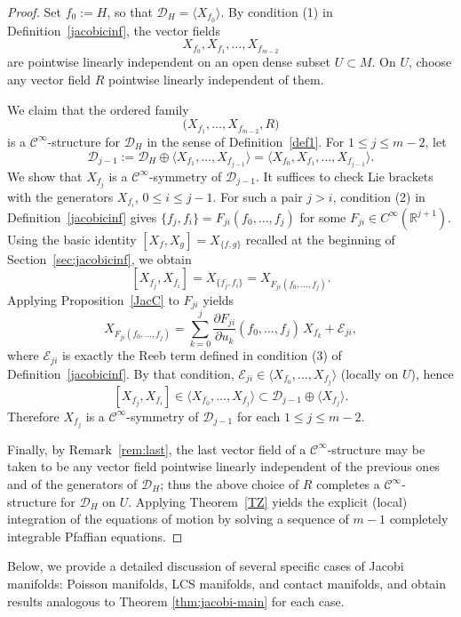 \documentclass{article}
\theoremstyle{remark}
\theoremstyle{definition}
\newcommand{\cinf}{$\mathcal{C}^{\infty}$}
\begin{document}
\begin{proof}
Set $f_0:=H$, so that $\mathcal{D}_H=\langle X_{f_0}\rangle$.
By condition \textup{(1)} in Definition~\ref{jacobicinf}, the vector fields
\[
X_{f_0},X_{f_1},\dots,X_{f_{m-2}}
\]
are pointwise linearly independent on an open dense subset $U\subset M$.
On $U$, choose any vector field $R$ pointwise linearly independent of them.

We claim that the ordered family
\[
\bigl(X_{f_1},\dots,X_{f_{m-2}},R\bigr)
\]
is a \cinf-structure for $\mathcal{D}_H$ in the sense of Definition~\ref{def1}.
For $1\le j\le m-2$, let
\[
\mathcal{D}_{j-1}:=\mathcal{D}_H\oplus\langle X_{f_1},\dots,X_{f_{j-1}}\rangle
=\langle X_{f_0},X_{f_1},\dots,X_{f_{j-1}}\rangle.
\]
We show that $X_{f_j}$ is a \cinf-symmetry of $\mathcal{D}_{j-1}$.
It suffices to check Lie brackets with the generators $X_{f_i}$, $0\le i\le j-1$.
For such a pair $j>i$, condition \textup{(2)} in Definition~\ref{jacobicinf} gives
\(
\{f_j,f_i\}=F_{ji}(f_0,\dots,f_j)
\)
for some $F_{ji}\in C^\infty(\mathbb{R}^{j+1})$.
Using the basic identity $[X_f,X_g]=X_{\{f,g\}}$ recalled at the beginning of Section~\ref{sec:jacobicinf}, we obtain
\[
[X_{f_j},X_{f_i}]=X_{\{f_j,f_i\}}=X_{F_{ji}(f_0,\dots,f_j)}.
\]
Applying Proposition~\ref{JacC} to $F_{ji}$ yields
\[
X_{F_{ji}(f_0,\dots,f_j)}=\sum_{k=0}^j \frac{\partial F_{ji}}{\partial u_k}(f_0,\dots,f_j)\,X_{f_k}+\mathcal{E}_{ji},
\]
where $\mathcal{E}_{ji}$ is exactly the Reeb term defined in condition \textup{(3)} of Definition~\ref{jacobicinf}.
By that condition, $\mathcal{E}_{ji}\in\langle X_{f_0},\dots,X_{f_j}\rangle$ (locally on $U$), hence
\[
[X_{f_j},X_{f_i}]\in\langle X_{f_0},\dots,X_{f_j}\rangle\subset \mathcal{D}_{j-1}\oplus\langle X_{f_j}\rangle.
\]
Therefore $X_{f_j}$ is a \cinf-symmetry of $\mathcal{D}_{j-1}$ for each $1\le j\le m-2$.

Finally, by Remark~\ref{rem:last}, the last vector field of a \cinf-structure may be taken to be any vector field pointwise linearly independent of the previous ones and of the generators of $\mathcal{D}_H$; thus the above choice of $R$ completes a \cinf-structure for $\mathcal{D}_H$ on $U$.
Applying Theorem~\ref{TZ} yields the explicit (local) integration of the equations of motion by solving a sequence of $m-1$ completely integrable Pfaffian equations.
\end{proof}

Below, we provide a detailed discussion of several specific cases of Jacobi manifolds: Poisson manifolds, LCS manifolds, and contact manifolds, and obtain results analogous to Theorem \ref{thm:jacobi-main} for each case.
\end{document}
